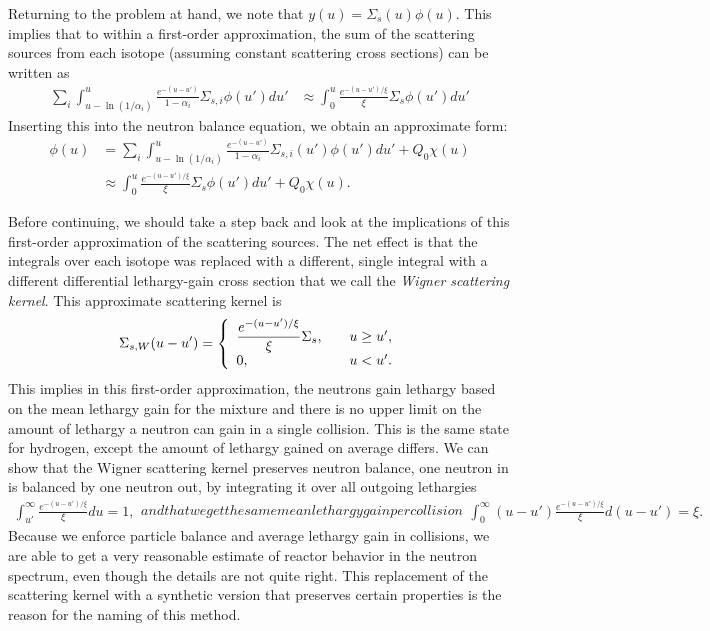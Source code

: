 Returning to the problem at hand, we note that $y(u) = \Sigma_s(u) \phi(u)$. This implies that to within a first-order approximation, the sum of the scattering sources from each isotope (assuming constant scattering cross sections) can be written as
\begin{align}
   \sum_i \int_{u-\ln(1/\alpha_i)}^u \frac{e^{-(u-u')}}{1 - \alpha_i} \Sigma_{s,i} \phi(u') du'
  &\approx  \int_0^u \frac{ e^{-(u - u')/\xi} }{ \xi } \Sigma_s \phi(u') du'
\end{align}
Inserting this into the neutron balance equation, we obtain an approximate form:
\begin{align}
  [ B^2 D(u) + \Sigma_t(u) ] \phi(u) &= \sum_i \int_{u-\ln(1/\alpha_i)}^u \frac{e^{-(u-u')}}{1 - \alpha_i} \Sigma_{s,i}(u') \phi(u') du' + Q_0 \chi(u) \nonumber \\
  &\approx \int_0^u \frac{ e^{-(u - u')/\xi} }{ \xi } \Sigma_s \phi(u') du' + Q_0 \chi(u). \label{Eq:thermalization_neutronBalance_WignerScatteringKernel}
\end{align}

Before continuing, we should take a step back and look at the implications of this first-order approximation of the scattering sources. The net effect is that the integrals over each isotope was replaced with a different, single integral with a different differential lethargy-gain cross section that we call the \emph{Wigner scattering kernel}. This approximate scattering kernel is
\begin{align}
  \Sigma_{s,W}(u - u') = \left\{ \begin{array}{l l}
  \dfrac{ e^{-(u-u')/\xi}}{\xi} \Sigma_s , & \quad u \ge u', \\
  0,	&\quad u < u'. \\ \end{array} \right.
\end{align}
This implies in this first-order approximation, the neutrons gain lethargy based on the mean lethargy gain for the mixture and there is no upper limit on the amount of lethargy a neutron can gain in a single collision. This is the same state for hydrogen, except the amount of lethargy gained on average differs. We can show that the Wigner scattering kernel preserves neutron balance, one neutron in is balanced by one neutron out, by integrating it over all outgoing lethargies
\begin{subequations}
\begin{align}
  \int_{u'}^\infty \frac{e^{-(u-u')/\xi}}{\xi} du = 1 ,
\end{align}
and that we get the same mean lethargy gain per collision
\begin{align}
  \int_0^\infty (u - u') \frac{e^{-(u-u')/\xi}}{\xi} d(u - u') = \xi.
\end{align}
\end{subequations}
Because we enforce particle balance and average lethargy gain in collisions, we are able to get a very reasonable estimate of reactor behavior in the neutron spectrum, even though the details are not quite right. This replacement of the scattering kernel with a synthetic version that preserves certain properties is the reason for the naming of this method.

